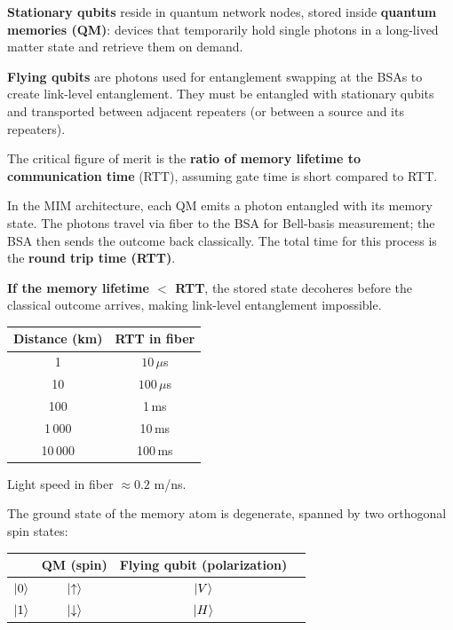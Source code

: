 \documentclass[10pt,a4paper]{article}
\begin{document}
\begin{tcolorbox}[defstyle, title={Stationary and Flying Qubits}]
\textbf{Stationary qubits} reside in quantum network nodes, stored inside \textbf{quantum memories (QM)}: devices that temporarily hold single photons in a long-lived matter state and retrieve them on demand.

\textbf{Flying qubits} are photons used for entanglement swapping at the BSAs to create link-level entanglement. They must be entangled with stationary qubits and transported between adjacent repeaters (or between a source and its repeaters).
\end{tcolorbox}

\begin{tcolorbox}[propstyle, title={Memory Lifetime vs.\ Round Trip Time}]
The critical figure of merit is the \textbf{ratio of memory lifetime to communication time} (RTT), assuming gate time is short compared to RTT.

In the MIM architecture, each QM emits a photon entangled with its memory state. The photons travel via fiber to the BSA for Bell-basis measurement; the BSA then sends the outcome back classically. The total time for this process is the \textbf{round trip time (RTT)}.

\textbf{If the memory lifetime $< $ RTT}, the stored state decoheres before the classical outcome arrives, making link-level entanglement impossible.

\medskip
\begin{center}
\begin{tabular}{cc}
\hline
\textbf{Distance (km)} & \textbf{RTT in fiber} \\
\hline
1       & $10\,\mu$s   \\
10      & $100\,\mu$s  \\
100     & 1\,ms        \\
1\,000  & 10\,ms       \\
10\,000 & 100\,ms      \\
\hline
\end{tabular}
\end{center}
\smallskip
Light speed in fiber $\approx 0.2$ m/ns.
\end{tcolorbox}


The ground state of the memory atom is degenerate, spanned by two orthogonal spin states:

\begin{center}
\begin{tabular}{lccc}
\hline
                       & \textbf{QM (spin)} & \textbf{Flying qubit (polarization)} \\
\hline
$\ket{0}$              & $\ket{\uparrow}$   & $\ket{V}$ \\
$\ket{1}$              & $\ket{\downarrow}$  & $\ket{H}$ \\
\hline
\end{tabular}
\end{center}
\end{document}
